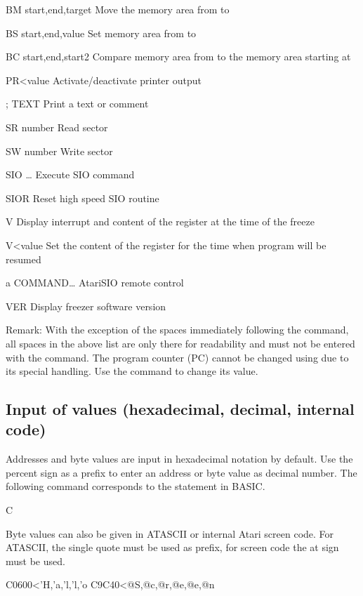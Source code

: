 \begin{fcmdlist}
\item[BM start,end,target]
Move the memory area from  to\newline
{}
\item[BS start,end,value]
Set memory area from  to 
\item[BC start,end,start2]
Compare memory area from  to the memory area starting at\linebreak
{}
\item[PR{\textless}value]
Activate/deactivate printer output
\item[; TEXT]
Print a text or comment
\item[SR number]
Read sector 
\item[SW number]
Write sector 
\item[SIO \dots]
Execute SIO command
\item[SIOR]
Reset high speed SIO routine
\item[V]
Display interrupt and content of the register  at the time of the
freeze
\item[V{\textless}value]
Set the content of the register  for the time when program will be
resumed
\item[a COMMAND\dots]
AtariSIO remote control
\item[VER]
Display freezer software version
\end{fcmdlist}

Remark: With the exception of the spaces immediately following the
command, all spaces in the above list are only there for readability and must
not be entered with the command. The program counter (PC) cannot be changed
using  due to its special handling. Use the  command to
change its value.

\subsection{Input of values (hexadecimal, decimal, internal code)}
Addresses and byte values are input in hexadecimal notation by default.
Use the percent sign \fq{\fcmd{\%}} as a prefix to enter an address or byte value as
decimal number. The following command corresponds to the statement
 in BASIC.
\begin{fcode}
C%
\end{fcode} 
Byte values can also be given in ATASCII or internal Atari screen code. For
ATASCII, the single quote  must be used as prefix, for screen code
the at sign  must be used.
\begin{fcode}
C0600<'H,'a,'l,'l,'o
C9C40<@S,@c,@r,@e,@e,@n
\end{fcode}

